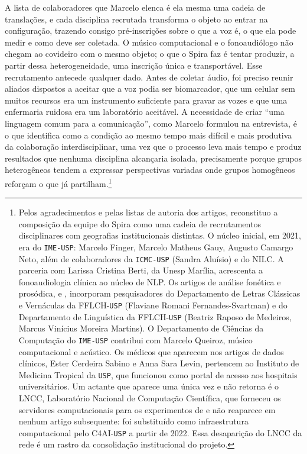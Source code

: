 A lista de colaboradores que Marcelo elenca é ela mesma uma cadeia de translações, e cada disciplina recrutada transforma o objeto ao entrar na configuração, trazendo consigo pré-inscrições sobre o que a voz é, o que ela pode medir e como deve ser coletada. O músico computacional e o fonoaudiólogo não chegam ao covideiro com o mesmo objeto; o que o Spira faz é tentar produzir, a partir dessa heterogeneidade, uma inscrição única e transportável. Esse recrutamento antecede qualquer dado. Antes de coletar áudio, foi preciso reunir aliados dispostos a aceitar que a voz podia ser biomarcador, que um celular sem muitos recursos era um instrumento suficiente para gravar as vozes e que uma enfermaria ruidosa era um laboratório aceitável. A necessidade de criar \enquote{uma linguagem comum para a comunicação}, como Marcelo formulou na entrevista, é o que \textcite{Wallach2014} identifica como a condição ao mesmo tempo mais difícil e mais produtiva da colaboração interdisciplinar, uma vez que o processo leva mais tempo e produz resultados que nenhuma disciplina alcançaria isolada, precisamente porque grupos heterogêneos tendem a expressar perspectivas variadas onde grupos homogêneos reforçam o que já partilham.\footnote{Pelos agradecimentos e pelas listas de autoria dos artigos, reconstituo a composição da equipe do Spira como uma cadeia de recrutamentos disciplinares com geografias institucionais distintas. O núcleo inicial, em 2021, era do \texttt{IME-USP}: Marcelo Finger, Marcelo Matheus Gauy, Augusto Camargo Neto, além de colaboradores da \texttt{ICMC-USP} (Sandra Aluísio) e do NILC. A parceria com Larissa Cristina Berti, da Unesp Marília, acrescenta a fonoaudiologia clínica ao núcleo de NLP. Os artigos de análise fonética e prosódica, \textcite{Svartman2022Temporal} e \textcite{Berti2023Frequency}, incorporam pesquisadores do Departamento de Letras Clássicas e Vernáculas da FFLCH-\texttt{USP} (Flaviane Romani Fernandes-Svartman) e do Departamento de Linguística da FFLCH-\texttt{USP} (Beatriz Raposo de Medeiros, Marcus Vinícius Moreira Martins). O Departamento de Ciências da Computação do \texttt{IME-USP} contribui com Marcelo Queiroz, músico computacional e acústico. Os médicos que aparecem nos artigos de dados clínicos, Ester Cerdeira Sabino e Anna Sara Levin, pertencem ao Instituto de Medicina Tropical da \texttt{USP}, que funcionou como portal de acesso aos hospitais universitários. Um actante que aparece uma única vez e não retorna é o LNCC, Laboratório Nacional de Computação Científica, que forneceu os servidores computacionais para os experimentos de \textcite{Gauy2021MFCC} e não reaparece em nenhum artigo subsequente: foi substituído como infraestrutura computacional pelo C4AI-\texttt{USP} a partir de 2022. Essa desaparição do LNCC da rede é um rastro da consolidação institucional do projeto.}

